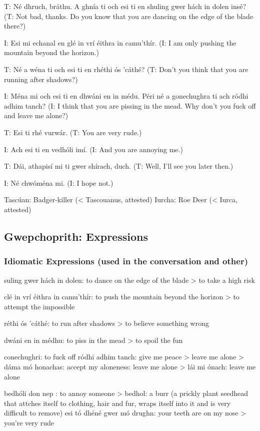T: N\'{e} dhruch, br\'{a}thu. A ghn\'{i}a ti och esi ti en shuling gwer h\'{a}ch in dolen ins\'{e}?
(T: Not bad, thanks. Do you know that you are dancing on the edge of the blade there?)

I: Esi mi echanal en gl\'{e} in vr\'{i} \'{e}ithra in camu'th\'{i}r.
(I: I am only pushing the mountain beyond the horizon.)

T: N\'{e} a w\'{e}na ti och esi ti en rh\'{e}thi \'{o}s 'c\'{a}th\'{e}?
(T: Don't you think that you are running after shadows?)

I: M\'{e}na mi och esi ti en dhw\'{a}ni en in m\'{e}du. P\'{e}ri n\'{e} a gonechughra ti ach r\'{o}dhi adhim tanch?
(I: I think that you are pissing in the mead. Why don't you fuck off and leave me alone?)

T: Esi ti rh\'{e} vurw\'{a}r.
(T: You are very rude.)

I: Ach esi ti en vedh\'{o}li im\'{i}.
(I: And you are annoying me.)

T: D\'{a}i, athapis\'{i} mi ti gwer sh\'{i}rach, duch.
(T: Well, I'll see you later then.)

I: N\'{e} chw\'{o}m\'{e}na mi.
(I: I hope not.)

Tasc\'{u}an: Badger-killer (< Tascouanus, attested)
Iurcha: Roe Deer (< Iurca, attested)

\subsection{Gwepchoprith: Expressions}
\subsubsection{Idiomatic Expressions (used in the conversation and other)}

suling gwer h\'{a}ch in dolen: to dance on the edge of the blade
> to take a high risk

cl\'{e} in vr\'{i} \'{e}ithra in camu'th\'{i}r: to push the mountain beyond the horizon
> to attempt the impossible

r\'{e}thi \'{o}s 'c\'{a}th\'{e}: to run after shadows
> to believe something wrong

dw\'{a}ni en in m\'{e}dhu: to piss in the mead
> to spoil the fun

conechughri: to fuck off
r\'{o}dhi adhim tanch: give me peace > leave me alone
> d\'{a}ma m\'{o} honachas: accept my aloneness: leave me alone
> l\'{a}i mi \'{o}nach: leave me alone

bedh\'{o}li don nep : to annoy someone
> bedhol: a burr (a prickly plant seedhead that attches itself to clothing, hair and fur, wraps itself into it and is very difficult to remove) esi t\'{o} dh\'{e}n\'{e} gwer m\'{o} drughn: your teeth are on my nose 
> you're very rude

